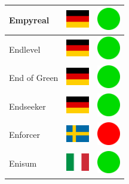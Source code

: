 \documentclass[12pt, a4paper, twoside]{report}
\begin{document}
\begin{center}
\begin{longtable}{|p{5cm}|p{2cm}|p{2cm}|}
 Empyreal                                                   & \includegraphics[width=1cm]{4x3/de} &   \includegraphics[width=1cm]{likes/y} \\ \hline
 Endlevel                                                   & \includegraphics[width=1cm]{4x3/de} &   \includegraphics[width=1cm]{likes/y} \\ \hline
 End of Green                                               & \includegraphics[width=1cm]{4x3/de} &   \includegraphics[width=1cm]{likes/y} \\ \hline
 Endseeker                                                  & \includegraphics[width=1cm]{4x3/de} &   \includegraphics[width=1cm]{likes/y} \\ \hline
 Enforcer                                                   & \includegraphics[width=1cm]{4x3/se} &   \includegraphics[width=1cm]{likes/n} \\ \hline
 Enisum                                                     & \includegraphics[width=1cm]{4x3/it} &   \includegraphics[width=1cm]{likes/y} \\ \hline

\end{longtable}
\end{center}
\end{document}
